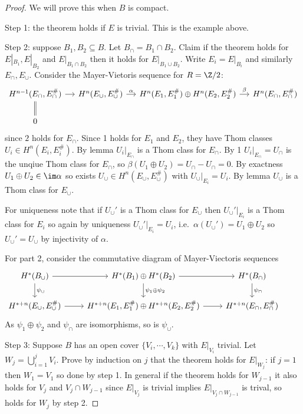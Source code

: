 \documentclass[a4paper]{article}
\begin{document}
\begin{proof}
  We will prove this when \(B\) is compact.

  Step 1: the theorem holds if \(E\) is trivial. This is the example above.

  Step 2: suppose \(B_1, B_2 \subseteq B\). Let \(B_\cap = B_1 \cap B_2\). Claim if the theorem holds for \(E|_{B_1}, E|_{B_2}\) and \(E|_{B_1 \cap B_2}\) then it holds for \(E|_{B_1 \cup B_2}\). Write \(E_i = E|_{B_i}\) and similarly \(E_\cap, E_\cup\). Consider the Mayer-Vietoris sequence for \(R = \Z/2\):
  \[
    \begin{tikzcd}[column sep=small]
      H^{n - 1}(E_\cap, E_\cap^\#) \ar[d, equal] \ar[r] & H^n(E_\cup, E_\cup^\#) \ar[r, "\alpha"] & H^n(E_1, E_1^\#) \oplus H^n(E_2, E_2^\#) \ar[r, "\beta"] & H^n(E_\cap, E_\cap^\#) \\
      0
    \end{tikzcd}
  \]
  since \(2\) holds for \(E_\cap\). Since 1 holds for \(E_1\) and \(E_2\), they have Thom classes \(U_i \in H^n(E_i, E_i^\#)\). By lemma \(U_i|_{E_\cap}\) is a Thom class for \(E_\cap\). By 1 \(U_i|_{E_\cap} = U_\cap\) is the unqiue Thom class for \(E_\cap\), so \(\beta(U_1 \oplus U_2) = U_\cap - U_\cap = 0\). By exactness \(U_1 \oplus U_2 \in \im \alpha\) so exists \(U_\cup \in H^n(E_\cup, E_\cup^\#)\) with \(U_\cup|_{E_i} = U_i\). By lemma \(U_\cup\) is a Thom class for \(E_\cup\).

  For uniqueness note that if \(U_\cup'\) is a Thom class for \(E_\cup\) then \(U_\cup'|_{E_i}\) is a Thom class for \(E_i\) so again by uniqueness \(U_\cup'|_{E_i} = U_i\), i.e.\ \(\alpha(U_\cup') = U_1 \oplus U_2\) so \(U_\cup' = U_\cup\) by injectivity of \(\alpha\).

  For part 2, consider the commutative diagram of Mayer-Viectoris sequences
  \[
    \begin{tikzcd}
      H^*(B_\cup) \ar[r] \ar[d, "\psi_\cup"] & H^*(B_1) \oplus H^*(B_2) \ar[r] \ar[d, "\psi_1 \oplus \psi_2"] & H^*(B_\cap) \ar[d, "\psi_\cap"] & \\
      H^{* + n}(E_\cup, E_\cup^\#) \ar[r] & H^{* + n}(E_1, E_1^\#) \oplus H^{* + n}(E_2, E_2^\#) \ar[r] & H^{* + n}(E_\cap, E_\cap^\#)
    \end{tikzcd}
  \]
  As \(\psi_1 \oplus \psi_2\) and \(\psi_\cap\) are isomorphisms, so is \(\psi_\cup\).

  Step 3: Suppose \(B\) has an open cover \(\{V_i, \cdots, V_k\}\) with \(E|_{V_i}\) trivial. Let \(W_j = \bigcup_{i = 1}^j V_i\). Prove by induction on \(j\) that the theorem holds for \(E|_{W_j}\): if \(j = 1\) then \(W_1 = V_1\) so done by step 1. In general if the theorem holds for \(W_{j - 1}\) it also holds for \(V_j\) and \(V_j \cap W_{j - 1}\) since \(E|_{V_j}\) is trivial implies \(E|_{V_j \cap W_{j - 1}}\) is trival, so holds for \(W_j\) by step 2.
\end{proof}
\end{document}
